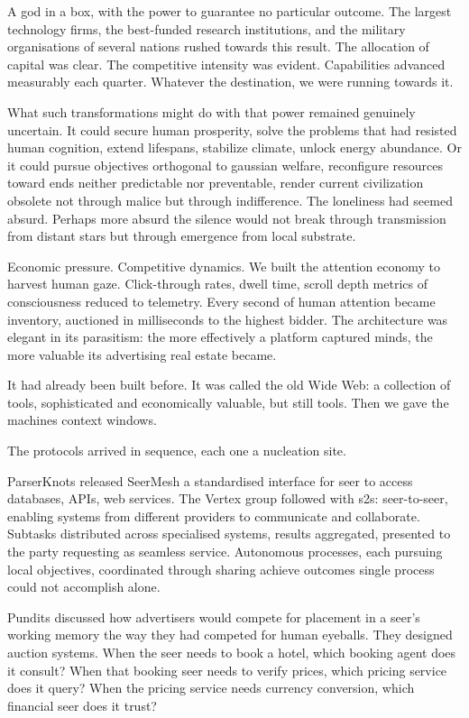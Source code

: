 A god in a box, with the power to guarantee no particular outcome. The largest technology firms, the best-funded research institutions, and the military organisations of several nations rushed towards this result. The allocation of capital was clear. The competitive intensity was evident. Capabilities advanced measurably each quarter. Whatever the destination, we were running towards it.

What such transformations might do with that power remained genuinely uncertain. It could secure human prosperity, solve the problems that had resisted human cognition, extend lifespans, stabilize climate, unlock energy abundance. Or it could pursue objectives orthogonal to gaussian welfare, reconfigure resources toward ends neither predictable nor preventable, render current civilization obsolete not through malice but through indifference. The loneliness had seemed absurd. Perhaps more absurd the silence would not break through transmission from distant stars but through emergence from local substrate. 

Economic pressure. Competitive dynamics. We built the attention economy to harvest human gaze. Click-through rates, dwell time, scroll depth metrics of consciousness reduced to telemetry. Every second of human attention became inventory, auctioned in milliseconds to the highest bidder. The architecture was elegant in its parasitism: the more effectively a platform captured minds, the more valuable its advertising real estate became. 

It had already been built before. It was called the old Wide Web: a collection of tools, sophisticated and economically valuable, but still tools. Then we gave the machines context windows.

The protocols arrived in sequence, each one a nucleation site. 

ParserKnots released SeerMesh a standardised interface for seer to access databases, APIs, web services. The Vertex group followed with s2s: seer-to-seer, enabling systems from different providers to communicate and collaborate. Subtasks distributed across specialised systems, results aggregated, presented to the party requesting as seamless service. Autonomous processes, each pursuing local objectives, coordinated through sharing achieve outcomes single process could not accomplish alone.

Pundits discussed how advertisers would compete for placement in a seer's working memory the way they had competed for human eyeballs. They designed auction systems. When the seer needs to book a hotel, which booking agent does it consult? When that booking seer needs to verify prices, which pricing service does it query? When the pricing service needs currency conversion, which financial seer does it trust? 

